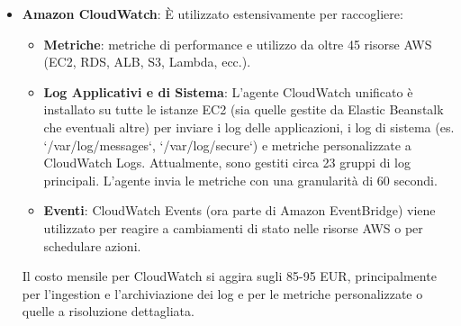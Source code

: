 \begin{itemize}
    \item \textbf{Amazon CloudWatch}: È utilizzato estensivamente per raccogliere:
    \begin{itemize}
        \item \textbf{Metriche}: metriche di performance e utilizzo da oltre 45 risorse AWS (EC2, RDS, ALB, S3, Lambda, ecc.).
        \item \textbf{Log Applicativi e di Sistema}: L'agente CloudWatch unificato è installato su tutte le istanze EC2 (sia quelle gestite da Elastic Beanstalk che eventuali altre) per inviare i log delle applicazioni, i log di sistema (es. `/var/log/messages`, `/var/log/secure`) e metriche personalizzate a CloudWatch Logs. Attualmente, sono gestiti circa 23 gruppi di log principali. L'agente invia le metriche con una granularità di 60 secondi.
        \item \textbf{Eventi}: CloudWatch Events (ora parte di Amazon EventBridge) viene utilizzato per reagire a cambiamenti di stato nelle risorse AWS o per schedulare azioni.
    \end{itemize}
    Il costo mensile per CloudWatch si aggira sugli 85-95 EUR, principalmente per l'ingestion e l'archiviazione dei log e per le metriche personalizzate o quelle a risoluzione dettagliata.
\end{itemize}

